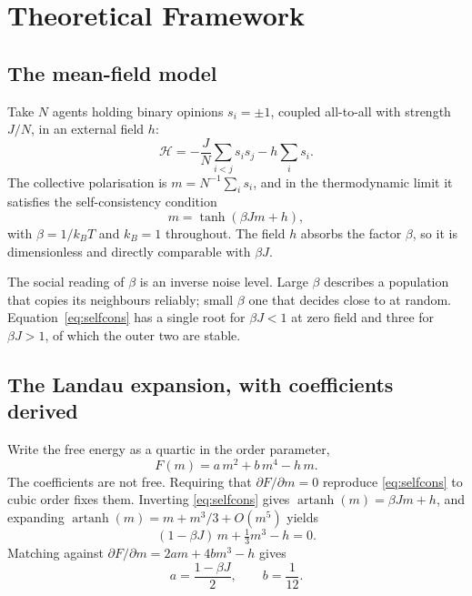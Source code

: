 \chapter{Theoretical Framework}
\label{ch:framework}

\section{The mean-field model}

Take $N$ agents holding binary opinions $s_i = \pm 1$, coupled all-to-all with strength $J/N$,
in an external field $h$:
\begin{equation}
\mathcal{H} = -\frac{J}{N}\sum_{i<j} s_i s_j - h \sum_i s_i .
\end{equation}
The collective polarisation is $m = N^{-1}\sum_i s_i$, and in the thermodynamic limit it
satisfies the self-consistency condition
\begin{equation}
m = \tanh\!\left(\beta J m + h\right),
\label{eq:selfcons}
\end{equation}
with $\beta = 1/k_B T$ and $k_B = 1$ throughout. The field $h$ absorbs the factor $\beta$, so
it is dimensionless and directly comparable with $\beta J$.

The social reading of $\beta$ is an inverse noise level. Large $\beta$ describes a population
that copies its neighbours reliably; small $\beta$ one that decides close to at random.
Equation~\eqref{eq:selfcons} has a single root for $\beta J < 1$ at zero field and three for
$\beta J > 1$, of which the outer two are stable.

\section{The Landau expansion, with coefficients derived}

Write the free energy as a quartic in the order parameter,
\begin{equation}
F(m) = a\,m^2 + b\,m^4 - h\,m .
\label{eq:landau}
\end{equation}
The coefficients are not free. Requiring that $\partial F/\partial m = 0$ reproduce
\eqref{eq:selfcons} to cubic order fixes them. Inverting \eqref{eq:selfcons} gives
$\operatorname{artanh}(m) = \beta J m + h$, and expanding
$\operatorname{artanh}(m) = m + m^3/3 + O(m^5)$ yields
\begin{equation}
(1 - \beta J)\,m + \tfrac{1}{3} m^3 - h = 0 .
\end{equation}
Matching against $\partial F/\partial m = 2am + 4bm^3 - h$ gives
\begin{equation}
a = \frac{1 - \beta J}{2}, \qquad b = \frac{1}{12}.
\label{eq:coefficients}
\end{equation}

